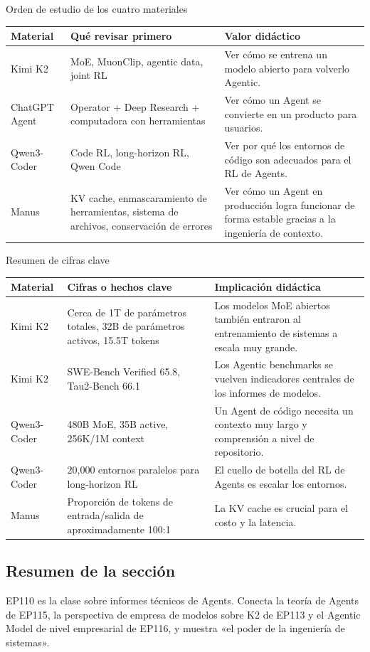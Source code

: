 \begin{knowledgebox}{Orden de estudio de los cuatro materiales}
\begin{tabularx}{\textwidth}{p{}p{}X}
\toprule
Material & Qué revisar primero & Valor didáctico \\
\midrule
Kimi K2 & MoE, MuonClip, agentic data, joint RL & Ver cómo se entrena un modelo abierto para volverlo Agentic. \\
ChatGPT Agent & Operator + Deep Research + computadora con herramientas & Ver cómo un Agent se convierte en un producto para usuarios. \\
Qwen3-Coder & Code RL, long-horizon RL, Qwen Code & Ver por qué los entornos de código son adecuados para el RL de Agents. \\
Manus & KV cache, enmascaramiento de herramientas, sistema de archivos, conservación de errores & Ver cómo un Agent en producción logra funcionar de forma estable gracias a la ingeniería de contexto. \\
\bottomrule
\end{tabularx}
\end{knowledgebox}

\begin{knowledgebox}{Resumen de cifras clave}
\begin{tabularx}{\textwidth}{p{}p{}X}
\toprule
Material & Cifras o hechos clave & Implicación didáctica \\
\midrule
Kimi K2 & Cerca de 1T de parámetros totales, 32B de parámetros activos, 15.5T tokens & Los modelos MoE abiertos también entraron al entrenamiento de sistemas a escala muy grande. \\
Kimi K2 & SWE-Bench Verified 65.8, Tau2-Bench 66.1 & Los Agentic benchmarks se vuelven indicadores centrales de los informes de modelos. \\
Qwen3-Coder & 480B MoE, 35B active, 256K/1M context & Un Agent de código necesita un contexto muy largo y comprensión a nivel de repositorio. \\
Qwen3-Coder & 20,000 entornos paralelos para long-horizon RL & El cuello de botella del RL de Agents es escalar los entornos. \\
Manus & Proporción de tokens de entrada/salida de aproximadamente 100:1 & La KV cache es crucial para el costo y la latencia. \\
\bottomrule
\end{tabularx}
\end{knowledgebox}

\subsection{Resumen de la sección}

EP110 es la clase sobre informes técnicos de Agents. Conecta la teoría de Agents de EP115, la perspectiva de empresa de modelos sobre K2 de EP113 y el Agentic Model de nivel empresarial de EP116, y muestra «el poder de la ingeniería de sistemas».
